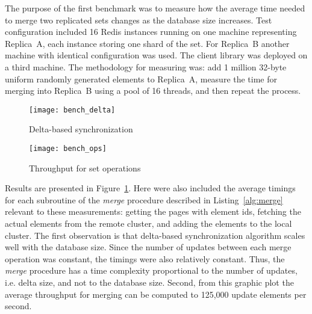 The purpose of the first benchmark was to measure how the average time needed to
merge two replicated sets changes as the database size increases. Test
configuration included 16 Redis instances running on one machine representing
Replica~A, each instance storing one shard of the set. For Replica~B another
machine with identical configuration was used. The client library was deployed
on a third machine. The methodology for measuring was: add 1 million 32-byte
uniform randomly generated elements to Replica~A, measure the time for merging
into Replica~B using a pool of 16 threads, and then repeat the process.

\begin{figure}[t]
  \centering
  \begin{minipage}{1\linewidth}
    \centering
    \texttt{[image: bench\_delta]}
    \caption{Delta-based synchronization}
    \label{fig:bench_delta}
  \end{minipage}
\end{figure}

\begin{figure}[t!]
  \centering
  \begin{minipage}{1\linewidth}
    \centering
    \texttt{[image: bench\_ops]}
    \caption{Throughput for set operations}
    \label{fig:bench_ops}
  \end{minipage}
\end{figure}

Results are presented in Figure~\ref{fig:bench_delta}. Here were also
included the average timings for each subroutine  of the \textit{merge}
procedure described in Listing~\ref{alg:merge} relevant to these measurements:
getting the pages with element ids, fetching the actual elements from the remote
cluster, and adding the elements to the local cluster. The first observation is
that delta-based synchronization algorithm scales well with the database size.
Since the number of updates between each merge operation was constant, the
timings were also relatively constant. Thus, the \textit{merge} procedure has a
time complexity proportional to the number of updates, i.e. delta size, and not
to the database size. Second, from this graphic plot the average throughput for
merging can be computed to 125,000 update elements per second.

